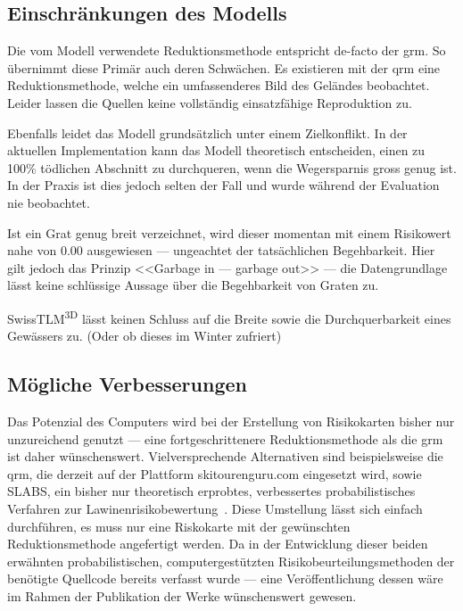 \clearpage

\subsection{Einschränkungen des Modells}
Die vom Modell verwendete Reduktionsmethode entspricht de-facto der \gls{grm}. So übernimmt diese Primär auch deren Schwächen. Es existieren mit der \gls{qrm} eine Reduktionsmethode, welche ein umfassenderes Bild des Geländes beobachtet.\cite{qrm}
Leider lassen die Quellen keine vollständig einsatzfähige Reproduktion zu.

Ebenfalls leidet das Modell grundsätzlich unter einem Zielkonflikt. In der aktuellen Implementation kann das Modell theoretisch entscheiden, einen zu 100\% tödlichen Abschnitt zu durchqueren, wenn die Wegersparnis gross genug ist. In der Praxis ist dies jedoch selten der Fall und wurde während der Evaluation nie beobachtet.

Ist ein Grat genug breit verzeichnet, wird dieser momentan mit einem Risikowert nahe von $0.00$ ausgewiesen --- ungeachtet der tatsächlichen Begehbarkeit. Hier gilt jedoch das Prinzip <<Garbage in --- garbage out>> --- die Datengrundlage lässt keine schlüssige Aussage über die Begehbarkeit von Graten zu.

SwissTLM\textsuperscript{3D} lässt keinen Schluss auf die Breite sowie die Durchquerbarkeit eines Gewässers zu. (Oder ob dieses im Winter zufriert)

\subsection{Mögliche Verbesserungen}\label{sec:improvements}

Das Potenzial des Computers wird bei der Erstellung von Risikokarten bisher nur unzureichend genutzt --- eine fortgeschrittenere Reduktionsmethode als die \gls{grm} ist daher wünschenswert. Vielversprechende Alternativen sind beispielsweise die \acrlong{qrm}, die derzeit auf der Plattform skitourenguru.com eingesetzt wird, sowie SLABS, ein bisher nur theoretisch erprobtes, verbessertes probabilistisches Verfahren zur Lawinenrisikobewertung~\cite{qrm}\cite{slabs}. Diese Umstellung lässt sich einfach durchführen, es muss nur eine Riskokarte mit der gewünschten Reduktionsmethode angefertigt werden. Da in der Entwicklung dieser beiden erwähnten probabilistischen, computergestützten Risikobeurteilungsmethoden der benötigte Quellcode bereits verfasst wurde --- eine Veröffentlichung dessen wäre im Rahmen der Publikation der Werke wünschenswert gewesen.

